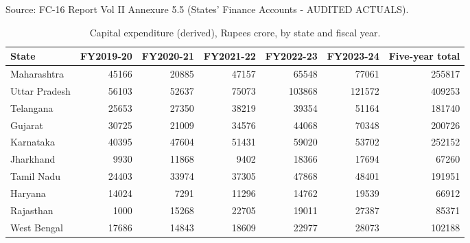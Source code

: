 \documentclass[12pt,a4paper]{article}
\begin{document}
Source: FC-16 Report Vol II Annexure 5.5 (States' Finance Accounts - AUDITED ACTUALS).

\begin{table}[H]
\centering
\caption{Capital expenditure (derived), Rupees crore, by state and fiscal year.}
\label{tab:7}
\footnotesize
\begin{adjustbox}{max width=\textwidth}
\begin{tabular}{@{}lrrrrrr@{}}
\toprule
State & FY2019-20 & FY2020-21 & FY2021-22 & FY2022-23 & FY2023-24 & Five-year total \\
\midrule
Maharashtra & 45166 & 20885 & 47157 & 65548 & 77061 & 255817 \\
Uttar Pradesh & 56103 & 52637 & 75073 & 103868 & 121572 & 409253 \\
Telangana & 25653 & 27350 & 38219 & 39354 & 51164 & 181740 \\
Gujarat & 30725 & 21009 & 34576 & 44068 & 70348 & 200726 \\
Karnataka & 40395 & 47604 & 51431 & 59020 & 53702 & 252152 \\
Jharkhand & 9930 & 11868 & 9402 & 18366 & 17694 & 67260 \\
Tamil Nadu & 24403 & 33974 & 37305 & 47868 & 48401 & 191951 \\
Haryana & 14024 & 7291 & 11296 & 14762 & 19539 & 66912 \\
Rajasthan & 1000 & 15268 & 22705 & 19011 & 27387 & 85371 \\
West Bengal & 17686 & 14843 & 18609 & 22977 & 28073 & 102188 \\
\bottomrule
\end{tabular}
\end{adjustbox}
\end{table}
\end{document}
